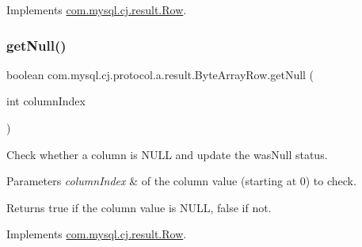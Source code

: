 Implements \mbox{\hyperlink{interfacecom_1_1mysql_1_1cj_1_1result_1_1_row_a063918cd10fe7c3ef5df95b33e21f19e}{com.\+mysql.\+cj.\+result.\+Row}}.

\mbox{\label{classcom_1_1mysql_1_1cj_1_1protocol_1_1a_1_1result_1_1_byte_array_row_a53f7e5fef1221819ac7c48db6dc9ce94}} 
\subsubsection{\texorpdfstring{get\+Null()}{getNull()}}
{\footnotesize\ttfamily boolean com.\+mysql.\+cj.\+protocol.\+a.\+result.\+Byte\+Array\+Row.\+get\+Null (\begin{DoxyParamCaption}\item[{int}]{column\+Index }\end{DoxyParamCaption})}

Check whether a column is N\+U\+LL and update the \textquotesingle{}was\+Null\textquotesingle{} status.


\begin{DoxyParams}{Parameters}
{\em column\+Index} & of the column value (starting at 0) to check.\\
\hline
\end{DoxyParams}
\begin{DoxyReturn}{Returns}
true if the column value is N\+U\+LL, false if not. 
\end{DoxyReturn}


Implements \mbox{\hyperlink{interfacecom_1_1mysql_1_1cj_1_1result_1_1_row_aaf07357d53c30067dfa87183a1e60a18}{com.\+mysql.\+cj.\+result.\+Row}}.

\mbox{\label{classcom_1_1mysql_1_1cj_1_1protocol_1_1a_1_1result_1_1_byte_array_row_a2606ac2688da3531d2e72bfd51949632}} 
